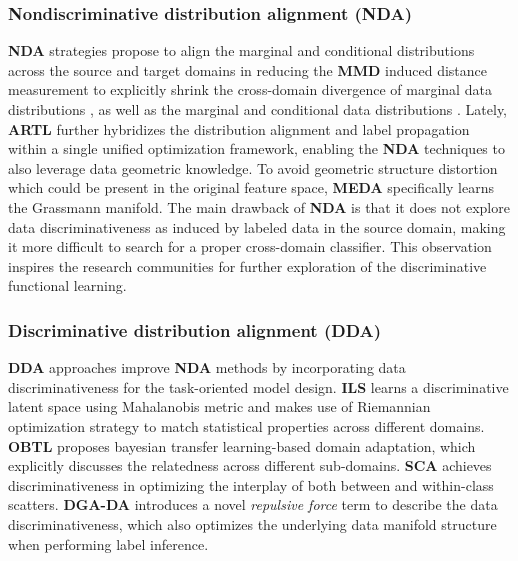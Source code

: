 \subsubsection{Nondiscriminative distribution alignment (\textbf{NDA})} \textbf{NDA} strategies propose to align the marginal and conditional distributions across the source and target domains in reducing the \textbf{MMD} induced distance measurement to explicitly shrink the cross-domain divergence of marginal data distributions  \cite{pan2011domain}, as well as the  marginal and conditional data distributions \cite{long2013transfer}. Lately, \textbf{ARTL} \cite{DBLP:journals/tkde/LongWDPY14} further hybridizes the distribution alignment and label propagation within a single unified optimization framework,  enabling the \textbf{NDA} techniques to also leverage data geometric knowledge. To avoid geometric structure distortion which could be present in the original feature space, \textbf{MEDA} \cite{wang2018visual} specifically learns the Grassmann manifold. The main drawback of \textbf{NDA} is that it does not explore data discriminativeness as induced by labeled data in the source domain, making it more difficult to search for a proper cross-domain classifier. This observation inspires the research communities for further exploration of the discriminative functional learning.



\subsubsection{Discriminative distribution alignment (\textbf{DDA})} \textbf{DDA} approaches improve \textbf{NDA} methods by incorporating data discriminativeness for the task-oriented model design.  \textbf{ILS} \cite{herath2017learning} learns a discriminative latent space using Mahalanobis metric and makes use of Riemannian optimization strategy to match statistical properties across different domains. \textbf{OBTL} \cite{karbalayghareh2018optimal} proposes bayesian transfer learning-based domain adaptation, which explicitly discusses the relatedness across different sub-domains.  \textbf{SCA} \cite{DBLP:journals/pami/GhifaryBKZ17} achieves discriminativeness in optimizing the interplay of both between and within-class scatters. \textbf{DGA-DA} \cite{luo2020discriminative} introduces a novel \textit{repulsive force} term to describe the data discriminativeness, which also optimizes the underlying data manifold structure when performing label inference. 


